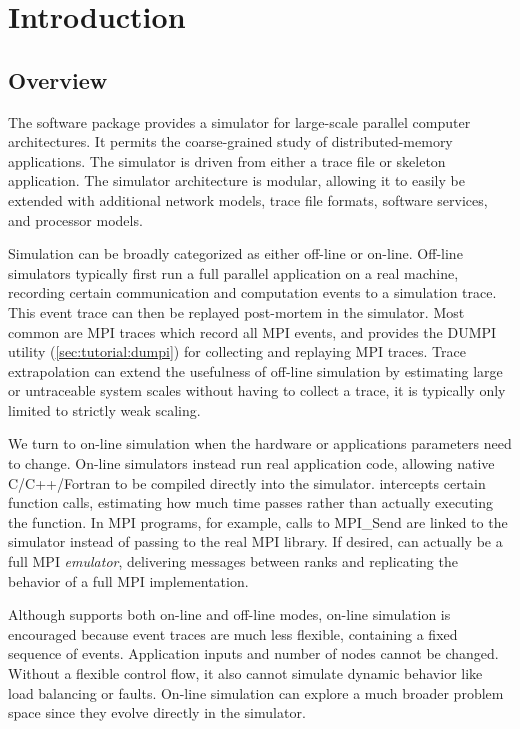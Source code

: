 
\chapter{Introduction}
\label{sec:intro}

\section{Overview}
\label{sec:intro:overview}

The \sstmacro software package provides a simulator for large-scale parallel computer architectures. 
It permits the coarse-grained study of distributed-memory applications. 
The simulator is driven from either a trace file or skeleton application. 
The simulator architecture is modular, allowing it to easily be extended with additional network models, 
trace file formats, software services, and processor models.

Simulation can be broadly categorized as either off-line or on-line.
Off-line simulators typically first run a full parallel application on a real machine,
recording certain communication and computation events to a simulation trace.
This event trace can then be replayed post-mortem in the simulator.
Most common are MPI traces which record all MPI events, and
\sstmacro provides the DUMPI utility (\ref{sec:tutorial:dumpi}) for collecting and replaying MPI traces. 
Trace extrapolation can extend the usefulness of off-line simulation by estimating large or untraceable system scales without   
having to collect a trace, it is typically only limited to strictly weak scaling.  

We turn to on-line simulation when the hardware or applications parameters need to change.
On-line simulators instead run real application code, allowing native C/C++/Fortran to be compiled directly into the simulator.
\sstmacro intercepts certain function calls, estimating how much time passes rather than actually executing the function.
In MPI programs, for example, calls to MPI\_Send are linked to the simulator instead of passing to the real MPI library.
If desired, \sstmacro can actually be a full MPI \emph{emulator}, delivering messages between ranks and replicating the behavior of a full MPI implementation.

Although \sstmacro supports both on-line and off-line modes, on-line simulation is encouraged because
event traces are much less flexible, containing a fixed sequence of events.
Application inputs and number of nodes cannot be changed. 
Without a flexible control flow, it also cannot simulate dynamic behavior like load balancing or faults.
On-line simulation can explore a much broader problem space since they evolve directly in the simulator.

